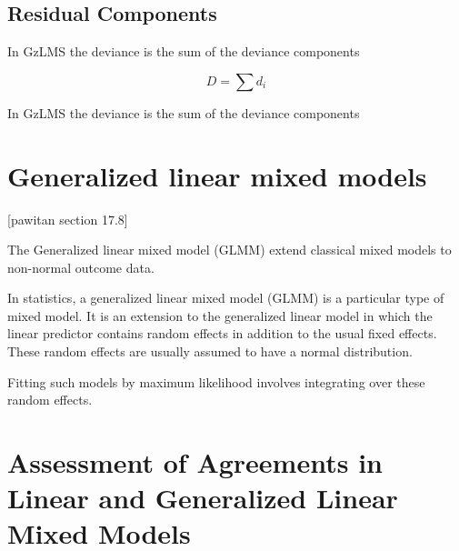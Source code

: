 \documentclass[12pt, a4paper]{report}
\theoremstyle{plain}
\theoremstyle{definition}
\theoremstyle{remark}
\begin{document}
	\subsection{Residual Components}
	In GzLMS the deviance is the sum of the deviance components
	
	\begin{equation}
	D = \sum d_{i}
	\end{equation}
	
	In GzLMS the deviance is the sum of the deviance components
	
	
	\section{Generalized linear mixed models}
	[pawitan section 17.8]
	
	The Generalized linear mixed model (GLMM) extend classical mixed models to non-normal outcome data.
	
	In statistics, a generalized linear mixed model (GLMM) is a particular type of mixed model. It is an extension to the
	generalized linear model in which the linear predictor contains random effects in addition to the usual fixed effects. These random effects are usually assumed to have a normal distribution.
	
	Fitting such models by maximum likelihood involves integrating over these random effects.
	
	
	

	
	
	\section{Assessment of Agreements in Linear and Generalized Linear Mixed Models}
	
\end{document}
